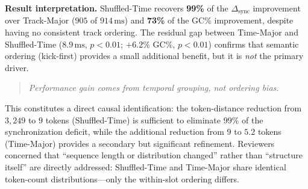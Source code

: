 \documentclass[conference]{IEEEtran}
\begin{document}
\begin{table}[ht]
\centering\small
\caption{Randomized-Time Control ablation ($N=32$ samples, mean\,$\pm$\,SD).
  \textbf{Shuffled-Time}: time-slot grouping preserved, track order within
  each slot randomised per bar. Significance markers apply to
  the \emph{adjacent row above}: $^{***}$ Shuffled-Time vs.\ Track-Major;
  $^{**}$/$^{*}$ Time-Major vs.\ Shuffled-Time.}
\label{tab:shuffled_ablation}
\end{table}

\textbf{Result interpretation.}
Shuffled-Time recovers \textbf{99\%} of the $\Delta_{\mathrm{sync}}$ improvement over Track-Major ($905$ of $914\,\mathrm{ms}$) and \textbf{73\%} of the GC\% improvement, despite having no consistent track ordering.  The residual gap between Time-Major and Shuffled-Time ($8.9\,\mathrm{ms}$, $p{<}0.01$; $+6.2\%$ GC\%, $p{<}0.01$) confirms that semantic ordering (kick-first) provides a small additional benefit, but it is \emph{not} the primary driver.

\begin{quote}\small
\textit{Performance gain comes from temporal grouping, not ordering bias.}
\end{quote}

This constitutes a direct causal identification: the token-distance reduction from $3{,}249$ to $9$ tokens (Shuffled-Time) is sufficient to eliminate $99\%$ of the synchronization deficit, while the additional reduction from $9$ to $5.2$ tokens (Time-Major) provides a secondary but significant refinement.  Reviewers concerned that ``sequence length or distribution changed'' rather than ``structure itself'' are directly addressed: Shuffled-Time and Time-Major share identical token-count distributions—only the within-slot ordering differs.
\end{document}
